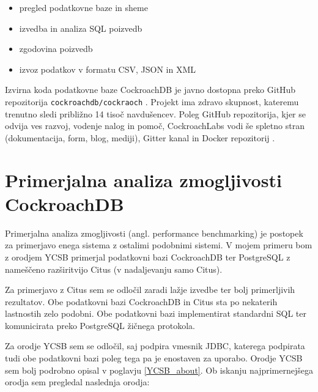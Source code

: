 \documentclass[a4paper, 12pt]{book}
\begin{document}
\begin{itemize}
    \item pregled podatkovne baze in sheme
    \item izvedba in analiza SQL poizvedb
    \item zgodovina poizvedb
    \item izvoz podatkov v formatu CSV, JSON in XML
\end{itemize}

Izvirna koda podatkovne baze CockroachDB je javno dostopna preko GitHub repozitorija \texttt{cockroachdb/cockraoch} \cite{cockroachdb/cockroach}. Projekt ima zdravo skupnost, kateremu trenutno sledi približno 14 tisoč navdušencev. Poleg GitHub repozitorija, kjer se odvija ves razvoj, vodenje nalog in pomoč, CockroachLabs vodi še spletno stran \cite{CRDB-home} (dokumentacija, form, blog, mediji), Gitter kanal \cite{CRDB-gitter} in Docker repozitorij \cite{CRDB-docker}.

\chapter{Primerjalna analiza zmogljivosti CockroachDB}

Primerjalna analiza zmogljivosti (angl. performance benchmarking) je postopek za primerjavo enega sistema z ostalimi podobnimi sistemi. V mojem primeru bom z orodjem YCSB primerjal podatkovni bazi CockroachDB ter PostgreSQL z nameščeno razširitvijo Citus (v nadaljevanju samo Citus). 

Za primerjavo z Citus sem se odločil zaradi lažje izvedbe ter bolj primerljivih rezultatov. Obe podatkovni bazi CockroachDB in Citus sta po nekaterih lastnostih zelo podobni. Obe podatkovni bazi implementirat standardni SQL ter komunicirata preko PostgreSQL žičnega protokola. 

Za orodje YCSB sem se odločil, saj podpira vmesnik JDBC, katerega podpirata tudi obe podatkovni bazi poleg tega pa je enostaven za uporabo. Orodje YCSB sem bolj podrobno opisal v poglavju \ref{YCSB_about}. Ob iskanju najprimernejšega orodja sem pregledal naslednja orodja:
\end{document}
